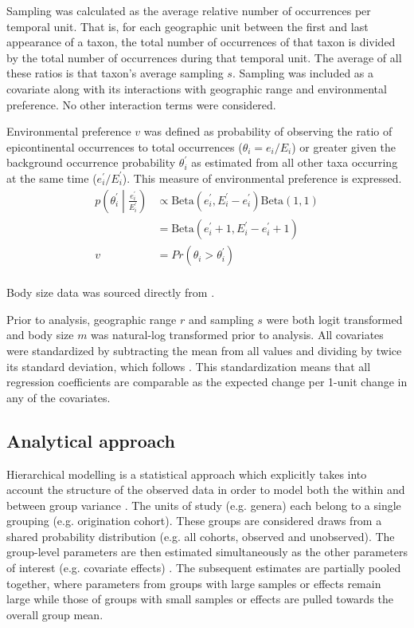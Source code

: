 \documentclass{article}
\begin{document}
Sampling was calculated as the average relative number of occurrences per temporal unit. That is, for each geographic unit between the first and last appearance of a taxon, the total number of occurrences of that taxon is divided by the total number of occurrences during that temporal unit. The average of all these ratios is that taxon's average sampling \(s\). Sampling was included as a covariate along with its interactions with geographic range and environmental preference. No other interaction terms were considered.

Environmental preference \(v\) was defined as probability of observing the ratio of epicontinental occurrences to total occurrences (\(\theta_{i} = e_{i} / E_{i}\)) or greater given the background occurrence probability \(\theta^{\prime}_{i}\) as estimated from all other taxa occurring at the same time (\(e^{\prime}_{i} / E^{\prime}_{i}\)). This measure of environmental preference is expressed.
\begin{equation}
  \begin{aligned}
    p\left(\theta^{\prime}_{i} \middle| \frac{e^{\prime}_{i}}{E^{\prime}_{i}}\right) &\propto \mathrm{Beta}(e^{\prime}_{i}, E^{\prime}_{i} - e^{\prime}_{i}) \mathrm{Beta}(1, 1) \\
    &= \mathrm{Beta}(e^{\prime}_{i} + 1, E^{\prime}_{i} - e^{\prime}_{i} + 1) \\
    v &= Pr(\theta_{i} > \theta^{\prime}_{i}) \\
  \end{aligned}
  \label{eq:envpref}
\end{equation}

Body size data was sourced directly from \citet{Payne2014}.

Prior to analysis, geographic range \(r\) and sampling \(s\) were both logit transformed and body size \(m\) was natural-log transformed prior to analysis. All covariates were standardized by subtracting the mean from all values and dividing by twice its standard deviation, which follows \citet{Gelman2007}. This standardization means that all regression coefficients are comparable as the expected change per 1-unit change in any of the covariates. 


\subsection{Analytical approach}

Hierarchical modelling is a statistical approach which explicitly takes into account the structure of the observed data in order to model both the within and between group variance \citep{Gelman2013d,Gelman2007}. The units of study (e.g. genera) each belong to a single grouping (e.g. origination cohort). These groups are considered draws from a shared probability distribution (e.g. all cohorts, observed and unobserved). The group-level parameters are then estimated simultaneously as the other parameters of interest (e.g. covariate effects) \citep{Gelman2013d}. The subsequent estimates are partially pooled together, where parameters from groups with large samples or effects remain large while those of groups with small samples or effects are pulled towards the overall group mean. 
\end{document}
